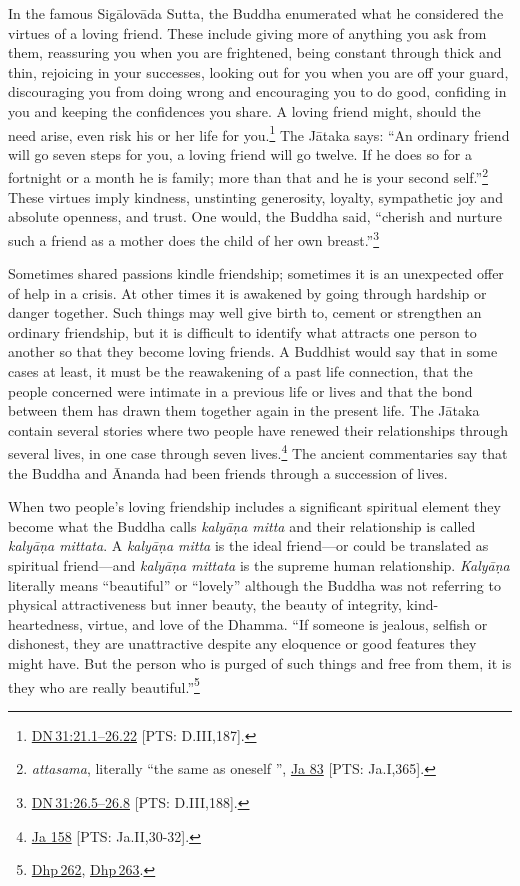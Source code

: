 \documentclass[10pt, openright]{book}
\begin{document}
In the famous Sigālovāda Sutta, the Buddha enumerated what he considered the virtues of a loving friend. These include giving more of anything you ask from them, reassuring you when you are frightened, being constant through thick and thin, rejoicing in your successes, looking out for you when you are off your guard, discouraging you from doing wrong and encouraging you to do good, confiding in you and keeping the confidences you share. A loving friend might, should the need arise, even risk his or her life for you.\footnote {\href{https://suttacentral.net/dn31/en/sujato\#21.1}{DN 31:21.1–26.22} [PTS: D.III,187].} The Jātaka says: “An ordinary friend will go seven steps for you, a loving friend will go twelve. If he does so for a fortnight or a month he is family; more than that and he is your second self.”\footnote {\textit{attasama}, literally “the same as oneself ”, \href{https://suttacentral.net/ja83/en/chalmers?reference=main/pts#pts-vp-pli365}{Ja 83} [PTS: Ja.I,365].} These virtues imply kindness, unstinting generosity, loyalty, sympathetic joy and absolute openness, and trust. One would, the Buddha said, “cherish and nurture such a friend as a mother does the child of her own breast.”\footnote {\href{https://suttacentral.net/dn31/en/sujato\#26.5}{DN 31:26.5–26.8} [PTS: D.III,188].}


Sometimes shared passions kindle friendship; sometimes it is an unexpected offer of help in a crisis. At other times it is awakened by going through hardship or danger together. Such things may well give birth to, cement or strengthen an ordinary friendship, but it is difficult to identify what attracts one person to another so that they become loving friends. A Buddhist would say that in some cases at least, it must be the reawakening of a past life connection, that the people concerned were intimate in a previous life or lives and that the bond between them has drawn them together again in the present life. The Jātaka contain several stories where two people have renewed their relationships through several lives, in one case through seven lives.\footnote {\href{https://suttacentral.net/ja158/en/rouse}{Ja 158} [PTS: Ja.II,30-32].} The ancient commentaries say that the Buddha and Ānanda had been friends through a succession of lives.


When two people’s loving friendship includes a significant spiritual element they become what the Buddha calls \textit{kalyāṇa mitta} and their relationship is called \textit{kalyāṇa mittata}. A \textit{kalyāṇa mitta} is the ideal friend—or could be translated as spiritual friend—and \textit{kalyāṇa mittata} is the supreme human relationship. \textit{Kalyāṇa} literally means “beautiful” or “lovely” although the Buddha was not referring to physical attractiveness but inner beauty, the beauty of integrity, kind-heartedness, virtue, and love of the Dhamma. “If someone is jealous, selfish or dishonest, they are unattractive despite any eloquence or good features they might have. But the person who is purged of such things and free from them, it is they who are really beautiful.”\footnote {\href{https://suttacentral.net/dhp262/en/sujato}{Dhp 262}, \href{https://suttacentral.net/dhp263/en/sujato}{Dhp 263}.}
\end{document}
